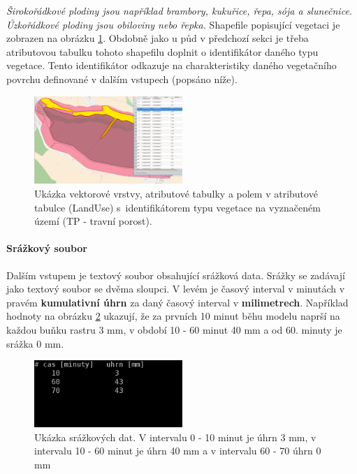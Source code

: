 \textit{Širokořádkové plodiny jsou například brambory, kukuřice, řepa, sója a slunečnice. Úzkořádkové plodiny jsou obiloviny nebo řepka.}
Shapefile popisující vegetaci je zobrazen na obrázku \ref{fig:bykovicevegetace}. Obdobně jako u půd v předchozí sekci je třeba atributovou tabulku tohoto shapefilu doplnit o identifikátor daného typu vegetace. Tento identifikátor odkazuje na charakteristiky daného vegetačního povrchu definované v dalším vstupech (popsáno níže).
\begin{figure}
  \centering
  \includegraphics[width=0.5\textwidth]{./img/lu.png}
  \caption{Ukázka vektorové vrstvy, atributové tabulky a polem v atributové tabulce (LandUse) s~identifikátorem typu vegetace na vyznačeném území (TP - travní porost).}
  \label{fig:bykovicevegetace}
\end{figure}


\paragraph{Srážkový soubor} \label{sec:vstupsrazka}

Dalším vstupem je textový soubor obsahující srážková data. 
% 
% 
% 
Srážky se zadávají jako textový soubor se dvěma sloupci. V levém je časový interval v minutách v pravém \textbf{kumulativní úhrn} za daný časový interval v \textbf{milimetrech}. Například hodnoty na obrázku \ref{fig:srazkovysoubor} ukazují, že za prvních 10 minut běhu modelu naprší  na každou buňku rastru 3 mm, v období 10 - 60 minut 40 mm a od 60. minuty je srážka 0 mm. 
\begin{figure}
  \centering
  \includegraphics[width=0.5\textwidth]{./img/srazka.png}
  \caption{Ukázka srážkových dat. V intervalu 0 - 10 minut je úhrn 3 mm, v intervalu 10 - 60 minut je úhrn 40 mm a v intervalu 60 - 70 úhrn 0 mm}
  \label{fig:srazkovysoubor}
\end{figure}


